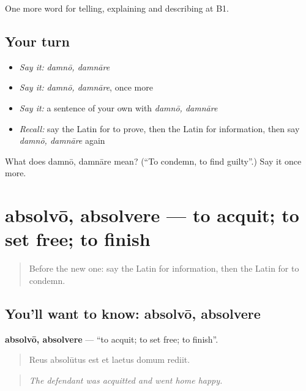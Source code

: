 \begin{grammarlens}[title={What you've built}]
One more word for telling, explaining and describing at B1.
\end{grammarlens}

\subsection*{Your turn}
\begin{itemize}
\raggedright
  \item \emph{Say it:} \emph{damnō, damnāre}
  \item \emph{Say it:} \emph{damnō, damnāre}, once more
  \item \emph{Say it:} a sentence of your own with \emph{damnō, damnāre}
  \item \emph{Recall:} say the Latin for to prove, then the Latin for information, then say \emph{damnō, damnāre} again
\end{itemize}

\begin{tcolorbox}[breakable,colback=teal!4,colframe=teal!35!black,title={Before you move on}]
What does damnō, damnāre mean? (\textquotedblleft{}To condemn, to find guilty\textquotedblright{}.) Say it once more.
\end{tcolorbox}
\section[absolvō, absolvere]{absolvō, absolvere — to acquit; to set free; to finish}

\label{lesson:LA-C311-absolvo}



\begin{quote}
Before the new one: say the Latin for information, then the Latin for to condemn.
\end{quote}

\subsection*{You'll want to know: absolvō, absolvere}
\textbf{absolvō, absolvere} — \textquotedblleft{}to acquit; to set free; to finish\textquotedblright{}.

\begin{quote}
Reus absolūtus est et laetus domum rediit.
\end{quote}

\begin{quote}
\emph{The defendant was acquitted and went home happy.}
\end{quote}

